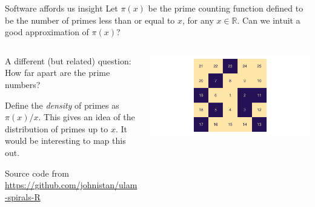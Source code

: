 \documentclass[,aspectratio=169]{beamer}
\newcommand{\bbR}{\mathbb{R}}
\begin{document}
\begin{frame}{Software affords us insight}
\protect\hypertarget{software-affords-us-insight}{}
Let \(\pi(x)\) be the prime counting function defined to be the number
of primes less than or equal to \(x\), for any \(x\in\bbR\). Can we
intuit a good approximation of \(\pi(x)\)?

\vspace{1em}
\pause

\begin{columns}[T]
\begin{column}{0.48\textwidth}
\vspace{1em}

A different (but related) question: How far apart are the prime numbers?

\vspace{1em}
\pause

Define the \emph{density} of primes as \(\pi(x)/x\). This gives an idea
of the distribution of primes up to \(x\). It would be interesting to
map this out.

\vspace{1em}

\footnotesize

Source code from \url{https://github.com/johnistan/ulam-spirals-R}
\end{column}

\begin{column}{0.48\textwidth}
\vspace{-1em}

\begin{center}\includegraphics[width=0.8\linewidth]{figure/unnamed-chunk-2-1} \end{center}
\end{column}
\end{columns}
\end{frame}
\end{document}
